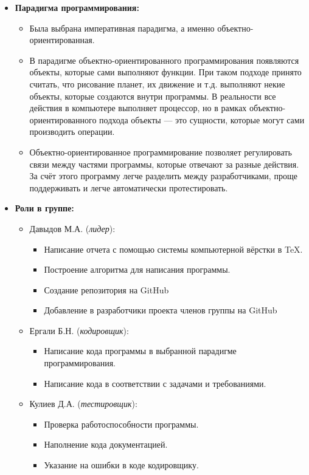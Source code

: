 \documentclass[14pt, oneside]{altsu-report}
\begin{document}
\begin{itemize}
    \item \textbf{Парадигма программирования:}
    \begin{itemize}
     \item Была выбрана императивная парадигма, а именно объектно-ориентированная.
     \item В парадигме объектно-ориентированного программирования появляются объекты, которые сами выполняют функции. При таком подходе принято считать, что рисование планет, их движение и т.д. выполняют некие объекты, которые создаются внутри программы. В реальности все действия в компьютере выполняет процессор, но в рамках объектно-ориентированного подхода объекты — это сущности, которые могут сами производить операции.
     \item Объектно-ориентированное программирование позволяет регулировать связи между частями программы, которые отвечают за разные действия. За счёт этого программу легче разделить между разработчиками, проще поддерживать и легче автоматически протестировать.
    \end{itemize}
    \item \textbf{Роли в группе:}
    \begin{itemize}
        \item Давыдов М.А. (\textit{лидер}):
            \begin{itemize}
                \item Написание отчета с помощью системы компьютерной вёрстки в \TeX.
                \item Построение алгоритма для написания программы.
                \item Создание репозитория на GitHub
                \item Добавление в разработчики проекта членов группы на GitHub
            \end{itemize}
        \item Ергали Б.Н. (\textit{кодировщик}):
            \begin{itemize}
                \item Написание кода программы в выбранной парадигме программирования.
                \item Написание кода в соответствии с задачами и требованиями.
            \end{itemize}
        \item Кулиев Д.А. (\textit{тестировщик}):
            \begin{itemize}
                \item Проверка работоспособности программы.
                \item Наполнение кода документацией.
                \item Указание на ошибки в коде кодировщику.
            \end{itemize}
        \end{itemize}
\end{itemize}
\end{document}

